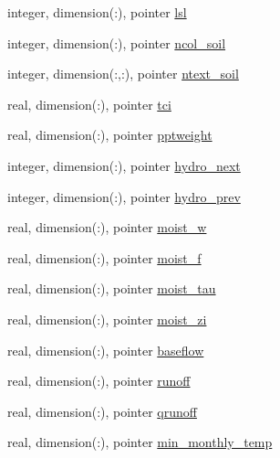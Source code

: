 \begin{DoxyCompactItemize}
integer, dimension(\+:), pointer \hyperlink{structed__state__vars_1_1polygontype_a9ea4c78df2bff7d313bf939ed44c7c45}{lsl}
\item 
integer, dimension(\+:), pointer \hyperlink{structed__state__vars_1_1polygontype_ad2a4d2cdc5931e4ff9a762b04c27cb2b}{ncol\+\_\+soil}
\item 
integer, dimension(\+:,\+:), pointer \hyperlink{structed__state__vars_1_1polygontype_a21bc85f325b6d5b59338e1bc96cf2f2d}{ntext\+\_\+soil}
\item 
real, dimension(\+:), pointer \hyperlink{structed__state__vars_1_1polygontype_a0fe95f22e01ff8f1439d409cf38a2795}{tci}
\item 
real, dimension(\+:), pointer \hyperlink{structed__state__vars_1_1polygontype_a7d394ad04838244493b2ef2589e6ca25}{pptweight}
\item 
integer, dimension(\+:), pointer \hyperlink{structed__state__vars_1_1polygontype_aa91e887d4a56487341ebd7e026215dba}{hydro\+\_\+next}
\item 
integer, dimension(\+:), pointer \hyperlink{structed__state__vars_1_1polygontype_ae549330e87bbb805d06184372db193d8}{hydro\+\_\+prev}
\item 
real, dimension(\+:), pointer \hyperlink{structed__state__vars_1_1polygontype_a65278b1a0a954b593d9a217e5ae248cc}{moist\+\_\+w}
\item 
real, dimension(\+:), pointer \hyperlink{structed__state__vars_1_1polygontype_a9c78bc4e380c3817f9ed9918f96a64b1}{moist\+\_\+f}
\item 
real, dimension(\+:), pointer \hyperlink{structed__state__vars_1_1polygontype_a9d9930c222f5780f2da0180adc6903d0}{moist\+\_\+tau}
\item 
real, dimension(\+:), pointer \hyperlink{structed__state__vars_1_1polygontype_ab11cac8998d4a854914c2efff2821115}{moist\+\_\+zi}
\item 
real, dimension(\+:), pointer \hyperlink{structed__state__vars_1_1polygontype_a6afb52c844d75a541348fb70a56222a5}{baseflow}
\item 
real, dimension(\+:), pointer \hyperlink{structed__state__vars_1_1polygontype_ad2bb3223c461b2bb2cbec96efbf138dd}{runoff}
\item 
real, dimension(\+:), pointer \hyperlink{structed__state__vars_1_1polygontype_ac7a4a0fee55d0f4cf675acf945578802}{qrunoff}
\item 
real, dimension(\+:), pointer \hyperlink{structed__state__vars_1_1polygontype_aad12bd3d42a77d2b1a4a21bc2eb90b56}{min\+\_\+monthly\+\_\+temp}
\item 

\end{DoxyCompactItemize}

